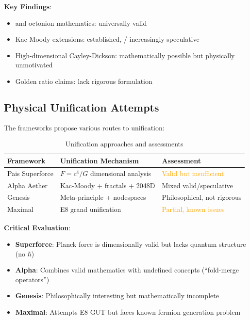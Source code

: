 \textbf{Key Findings}:
\begin{itemize}
    \item[$+$]  and octonion mathematics: universally valid
    \item[$\sim$] Kac-Moody extensions:  established, / increasingly speculative
    \item[$-$] High-dimensional Cayley-Dickson: mathematically possible but physically unmotivated
    \item[$-$] Golden ratio claims: lack rigorous formulation
\end{itemize}

\subsection{Physical Unification Attempts}

The frameworks propose various routes to unification:

\begin{table}[H]
\centering
\begin{tabular}{lp{7cm}l}
\toprule
\textbf{Framework} & \textbf{Unification Mechanism} & \textbf{Assessment} \\
\midrule
Pais Superforce & $F = c^4/G$ dimensional analysis & \textcolor{orange}{Valid but insufficient} \\
Alpha Aether & Kac-Moody + fractals + 2048D & \textcolor{claimcolor}{Mixed valid/speculative} \\
Genesis & Meta-principle + nodespaces & \textcolor{claimcolor}{Philosophical, not rigorous} \\
Maximal & E8 grand unification & \textcolor{orange}{Partial, known issues} \\
\bottomrule
\end{tabular}
\caption{Unification approaches and assessments}
\end{table}

\textbf{Critical Evaluation}:
\begin{itemize}
    \item \textbf{Superforce}: Planck force is dimensionally valid but lacks quantum structure (no $\hbar$)
    \item \textbf{Alpha}: Combines valid mathematics with undefined concepts (``fold-merge operators'')
    \item \textbf{Genesis}: Philosophically interesting but mathematically incomplete
    \item \textbf{Maximal}: Attempts E8 GUT but faces known fermion generation problem
\end{itemize}


